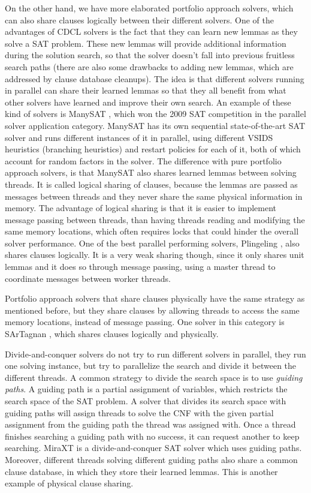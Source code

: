 \documentclass[12pt]{diicc}
\begin{document}
On the other hand, we have more elaborated portfolio approach solvers, which can also share clauses logically between their different solvers. One of the advantages of CDCL solvers is the fact that they can learn new lemmas as they solve a SAT problem. These new lemmas will provide additional information during the solution search, so that the solver doesn't fall into previous fruitless search paths (there are also some drawbacks to adding new lemmas, which are addressed by clause database cleanups). The idea is that different solvers running in parallel can share their learned lemmas so that they all benefit from what other solvers have learned and improve their own search. An example of these kind of solvers is ManySAT \cite{manysat}, which won the 2009 SAT competition in the parallel solver application category. ManySAT has its own sequential state-of-the-art SAT solver and runs different instances of it in parallel, using different VSIDS \cite{vsids} heuristics (branching heuristics) and restart policies for each of it, both of which account for random factors in the solver. The difference with pure portfolio approach solvers, is that ManySAT also shares learned lemmas between solving threads. It is called logical sharing of clauses, because the lemmas are passed as messages between threads and they never share the same physical information in memory. The advantage of logical sharing is that it is easier to implement message passing between threads, than having threads reading and modifying the same memory locations, which often requires locks that could hinder the overall solver performance. One of the best parallel performing solvers, Plingeling \cite{plingeling}, also shares clauses logically. It is a very weak sharing though, since it only shares unit lemmas and it does so through message passing, using a master thread to coordinate messages between worker threads. 

Portfolio approach solvers that share clauses physically have the same strategy as mentioned before, but they share clauses by allowing threads to access the same memory locations, instead of message passing. One solver in this category is SArTagnan \cite{sartagnan}, which shares clauses logically and physically. 

Divide-and-conquer solvers do not try to run different solvers in parallel, they run one solving instance, but try to parallelize the search and divide it between the different threads. A common strategy to divide the search space is to use \textit{guiding paths}. A guiding path is a partial assignment of variables, which restricts the search space of the SAT problem. A solver that divides its search space with guiding paths will assign threads to solve the CNF with the given partial assignment from the guiding path the thread was assigned with. Once a thread finishes searching a guiding path with no success, it can request another to keep searching. MiraXT \cite{miraxt} is a divide-and-conquer SAT solver which uses guiding paths. Moreover, different threads solving different guiding paths also share a common clause database, in which they store their learned lemmas. This is another example of physical clause sharing. 
\end{document}

